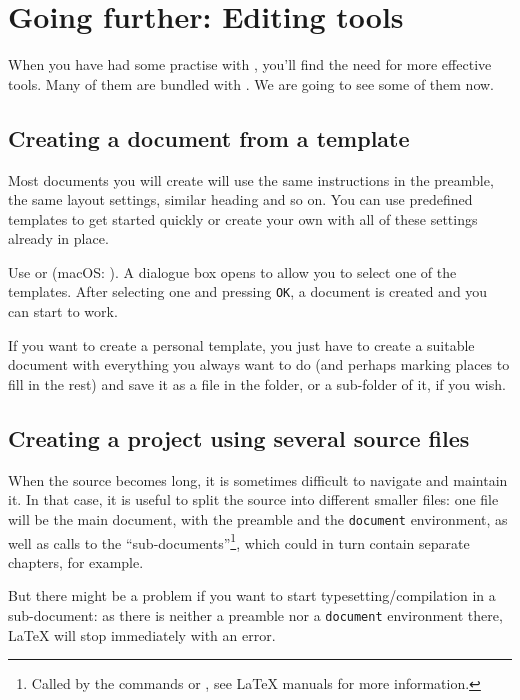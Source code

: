 
\chapter{Going further: Editing tools}

When you have had some practise with {\Tw}, you'll find the need for more effective tools. Many of them are bundled with {\Tw}. We are going to see some of them now.

\section{Creating a document from a template}

Most documents you will create will use the same instructions in the preamble, the same layout settings, similar heading and so on. You can use predefined templates to get started quickly or create your own with all of these settings already in place.

Use \submenu{} or  (macOS: ). A dialogue box opens to allow you to select one of the templates. After selecting one and pressing \verb|OK|, a document is created and you can start to work.

If you want to create a personal template, you just have to create a suitable document with everything you always want to do (and perhaps marking places to fill in the rest) and save it as a  file in the  folder, or a sub-folder of it, if you wish.

\section{Creating a project using several source files}

When the source becomes long, it is sometimes difficult to navigate and maintain it. In that case, it is useful to split the source into different smaller files: one file will be the main document, with the preamble and the \verb|document| environment, as well as calls to the ``sub-documents''\footnote{Called by the commands
\verb|| or \verb||, see {\LaTeX} manuals for more information.}, which could in turn contain separate chapters, for example.

But there might be a problem if you want to start typesetting/compilation in a sub-document: as there is neither a preamble nor a \verb|document| environment there, {\LaTeX} will stop immediately with an error.

